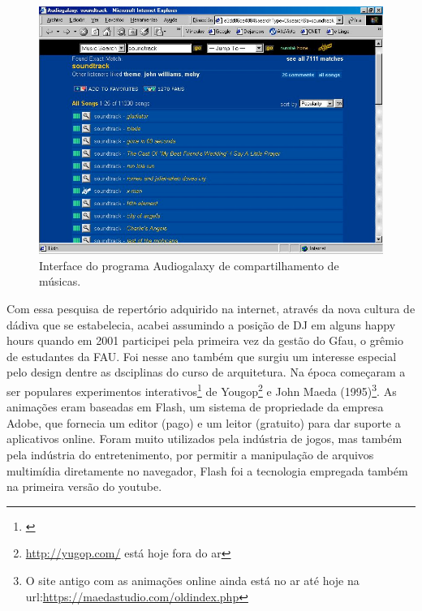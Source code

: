 \begin{figure}

\includegraphics[width=1\textwidth]{pictures/cap1/audiogalaxy}
\caption{Interface do programa Audiogalaxy de compartilhamento de músicas.}
\label{fig:audiogalaxy}
\end{figure}


Com essa pesquisa de repertório adquirido na internet, através da nova cultura de dádiva que se estabelecia, acabei assumindo a posição de DJ em alguns happy hours quando em 2001 participei pela primeira vez da gestão do Gfau, o grêmio de estudantes da FAU. Foi nesse ano também que surgiu um interesse especial pelo design dentre as dsciplinas do curso de arquitetura. Na época começaram a ser populares experimentos interativos\footnote{\cite{Pindado2005}} de Yougop\footnote{\url{http://yugop.com/} está hoje fora do ar} e John Maeda (1995)\footnote{O site antigo com as animações online ainda está no ar até hoje na url:\url{https://maedastudio.com/oldindex.php}}. As animações eram baseadas em Flash, um sistema de propriedade da empresa Adobe, que fornecia um editor (pago) e um leitor (gratuito) para dar suporte a aplicativos online. Foram muito utilizados pela indústria de jogos, mas também pela indústria do entretenimento, por permitir a manipulação de arquivos multimídia diretamente no navegador, Flash foi a tecnologia empregada também na primeira versão do youtube. 


